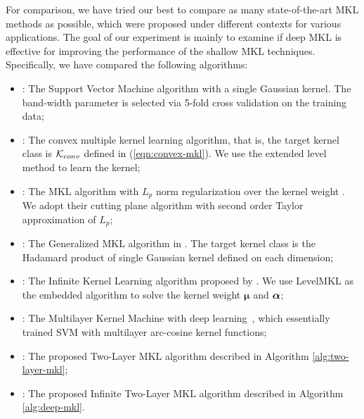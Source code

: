 For comparison, we have tried our best to compare as many state-of-the-art MKL
methods as possible, which were proposed under different contexts for various
applications. The goal of our experiment is mainly to examine if deep MKL is
effective for improving the performance of the shallow MKL techniques. Specifically,
we have compared the following algorithms:
\begin{itemize}
 \item [] \hspace{-1cm}{\bf SVM}: The Support Vector Machine algorithm with a single Gaussian kernel. The band-width parameter is selected via 5-fold cross
        validation on the training data;
  \item []: The convex multiple kernel learning algorithm, that is, the target
         kernel class is ${\mathcal K}_{conv}$ defined in (\ref{eqn:convex-mkl}). We use the
         extended level method \cite{nips/XuJKL08} to learn the kernel;
  \item []\hspace{-1cm}{\bf LpMKL}: The MKL algorithm with $L_p$ norm regularization over
        the kernel weight \cite{nips/KloftBSLMZ09}. We adopt their cutting plane
        algorithm with second order Taylor approximation of $L_p$;

  \item []\hspace{-1cm}{\bf GMKL}: The Generalized MKL algorithm in \cite{icml/VarmaB09}. The
        target kernel class is the Hadamard product of single Gaussian kernel defined
        on each dimension;
  \item []\hspace{-1cm}{\bf IKL}: The Infinite Kernel Learning algorithm proposed by \cite{tr/GehlerN08}.
        We use LevelMKL as the embedded algorithm to solve the kernel weight
        $\bm\mu$ and ${\boldsymbol{\alpha}}$;
  \item[]\hspace{-1cm}{\bf MKM}: The Multilayer Kernel Machine with deep learning~\cite{nips/ChoS09},
        which essentially trained SVM with multilayer arc-cosine kernel functions;
  \item[]\hspace{-1cm}{\bf 2LMKL}: The proposed Two-Layer MKL algorithm described in Algorithm \ref{alg:two-layer-mkl};
  \item[]: The proposed Infinite Two-Layer MKL algorithm described in Algorithm \ref{alg:deep-mkl}.
\end{itemize}

